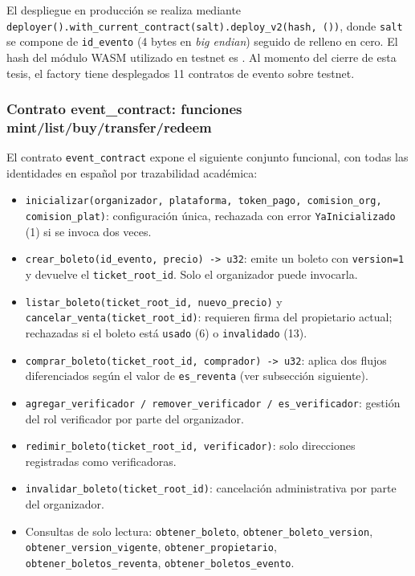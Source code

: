 El despliegue en producción se realiza mediante \texttt{deployer().with\_current\_contract(salt).deploy\_v2(hash, ())}, donde \texttt{salt} se compone de \texttt{id\_evento} (4 bytes en \textit{big endian}) seguido de relleno en cero. El hash del módulo WASM utilizado en testnet es . Al momento del cierre de esta tesis, el factory tiene desplegados 11 contratos de evento sobre testnet.

\subsubsection{Contrato event\_contract: funciones mint/list/buy/transfer/redeem}

El contrato \texttt{event\_contract} expone el siguiente conjunto funcional, con todas las identidades en español por trazabilidad académica:

\begin{itemize}
    \item \texttt{inicializar(organizador, plataforma, token\_pago, comision\_org, comision\_plat)}: configuración única, rechazada con error \texttt{YaInicializado} (1) si se invoca dos veces.
    \item \texttt{crear\_boleto(id\_evento, precio) -> u32}: emite un boleto con \texttt{version=1} y devuelve el \texttt{ticket\_root\_id}. Solo el organizador puede invocarla.
    \item \texttt{listar\_boleto(ticket\_root\_id, nuevo\_precio)} y \texttt{cancelar\_venta(ticket\_root\_id)}: requieren firma del propietario actual; rechazadas si el boleto está \texttt{usado} (6) o \texttt{invalidado} (13).
    \item \texttt{comprar\_boleto(ticket\_root\_id, comprador) -> u32}: aplica dos flujos diferenciados según el valor de \texttt{es\_reventa} (ver subsección siguiente).
    \item \texttt{agregar\_verificador / remover\_verificador / es\_verificador}: gestión del rol verificador por parte del organizador.
    \item \texttt{redimir\_boleto(ticket\_root\_id, verificador)}: solo direcciones registradas como verificadoras.
    \item \texttt{invalidar\_boleto(ticket\_root\_id)}: cancelación administrativa por parte del organizador.
    \item Consultas de solo lectura: \texttt{obtener\_boleto}, \texttt{obtener\_boleto\_version}, \texttt{obtener\_version\_vigente}, \texttt{obtener\_propietario}, \texttt{obtener\_boletos\_reventa}, \texttt{obtener\_boletos\_evento}.
\end{itemize}

